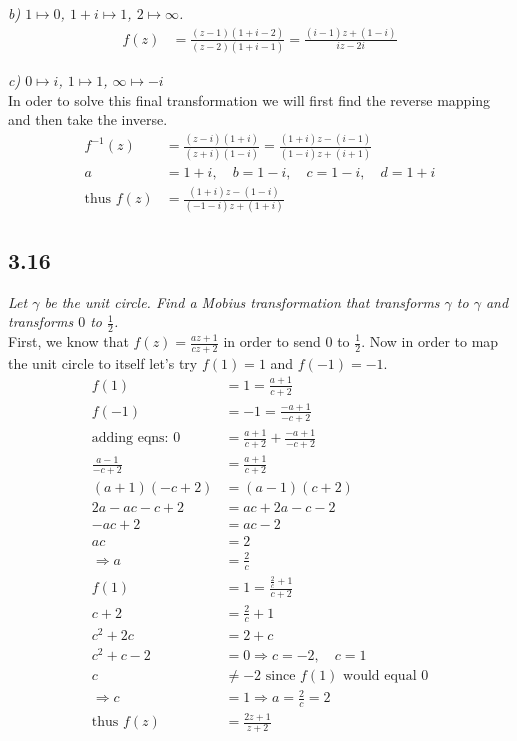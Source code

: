 \documentclass[a4paper, 11pt]{article}
\begin{document}
	\noindent\textit{b) $1\mapsto 0$, $1+i \mapsto 1$, $2\mapsto \infty$.} 
		\begin{align*}
			f(z) &= \frac{(z-1)(1+i-2)}{(z-2)(1+i-1)} =\frac{(i-1)z+(1-i)}{iz-2i} 
		\end{align*}
		
	\noindent\textit{c) $0 \mapsto i$, $1\mapsto 1$, $\infty \mapsto -i$}\\ 
	
	\noindent In oder to solve this final transformation we will first find the reverse mapping and then take the inverse. 
		\begin{align*}
			f^{-1}(z) &= \frac{(z-i)(1+i)}{(z+i)(1-i)} = \frac{(1+i)z-(i-1)}{(1-i)z+(i+1)} \\ 
			a &= 1+i, \quad b= 1-i, \quad c= 1-i, \quad d = 1+i \\ 
			\text{thus } f(z) &= \frac{(1+i)z-(1-i)}{(-1-i)z+(1+i)} 
		\end{align*}

\subsection*{3.16}
	\textit{Let $\gamma$ be the unit circle. Find a Mobius transformation that transforms $\gamma$ to $\gamma$ and transforms $0$ to $\frac{1}{2}$.} \\ 
	
	\noindent First, we know that $f(z) = \frac{az+1}{cz+2}$ in order to send $0$ to $\frac{1}{2}$. Now in order to map the unit circle to itself let's try $f(1)=1$ and $f(-1)=-1$. 
		\begin{align*}
			f(1) &=1 = \frac{a+1}{c+2} \\ 
			f(-1) &= -1 = \frac{-a+1}{-c+2} \\ 
			\text{adding eqns: } 0 &= \frac{a+1}{c+2} + \frac{-a+1}{-c+2} \\ 
			\frac{a-1}{-c+2} &= \frac{a+1}{c+2} \\ 
			(a+1)(-c+2) &= (a-1)(c+2) \\ 
			2a-ac-c+2 &= ac +2a -c -2 \\ 
			-ac +2 &= ac -2 \\ 
			ac &= 2 \\ 
			\Rightarrow a &= \frac{2}{c} \\ 
			f(1) &= 1 = \frac{\frac{2}{c}+1}{c+2} \\ 
			c+2 &= \frac{2}{c}+1 \\ 
			c^2 + 2c &= 2 + c \\ 
			c^2 + c -2 &= 0 \Rightarrow c = -2, \quad c=1  \\ 
			c&\neq -2 \text{ since } f(1) \text{ would equal } 0 \\ 
			\Rightarrow c &= 1 \Rightarrow a = \frac{2}{c} = 2\\ 
			\text{thus } f(z) &= \frac{2z+1}{z+2}
		\end{align*}
		
\end{document}
